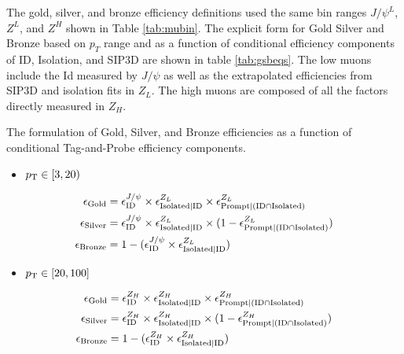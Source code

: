  The gold, silver, and bronze efficiency definitions used the same bin ranges $J/\psi^L$, $Z^L$, and $Z^H$ shown in Table \ref{tab:mubin}. The explicit form for Gold Silver and Bronze based on $p_T$ range and as a function of conditional efficiency components of ID, Isolation, and SIP3D are shown in table \ref{tab:gsbeqs}. The low \pt muons include the Id measured by $J/\psi$ as well as the extrapolated efficiencies from SIP3D and isolation fits in $Z_{L}$. The high \pt muons are composed of all the factors directly measured in $Z_H$.
\begin{table}
\caption{The formulation of Gold, Silver, and Bronze efficiencies as a function of conditional Tag-and-Probe efficiency components.} 
\label{tab:gsbeqs}
\begin{itemize}
\item[] $p_{\mathrm{T}} \in [3,20)$
\end{itemize}
\begin{equation}\label{eq:effcomp_J}
\begin{split}
\epsilon_{\text{Gold}}& = \epsilon_{\text{ID}}^{J/\psi}\times \epsilon_{\text{Isolated}|\text{ID}}^{Z_L} \times \epsilon_{\text{Prompt}|(\text{ID} \cap \text{Isolated})}^{Z_L} \\
\epsilon_{\text{Silver}}& = \epsilon_{\text{ID}}^{J/\psi} \times \epsilon_{\text{Isolated}|\text{ID}}^{Z_L} \times (1-\epsilon_{\text{Prompt}|(\text{ID} \cap \text{Isolated})}^{Z_L}) \\
\epsilon_{\text{Bronze}}& = 1-(\epsilon_{\text{ID}}^{J/\psi} \times \epsilon_{\text{Isolated}|\text{ID}}^{Z_L})
\end{split}
\end{equation}
\begin{itemize}
\item[] $p_{\mathrm{T}} \in [20,100 ]$
\end{itemize}
\begin{equation}\label{eq:effcomp_Z}
\begin{split}
\epsilon_{\text{Gold}}& = \epsilon_{\text{ID}}^{Z_H}\times\epsilon_{\text{Isolated}|\text{ID}}^{Z_H}\times\epsilon_{\text{Prompt}|(\text{ID} \cap \text{Isolated})}^{Z_H} \\
\epsilon_{\text{Silver}}& = \epsilon_{\text{ID}}^{Z_H}\times\epsilon_{\text{Isolated}|\text{ID}}^{Z_H}\times(1-\epsilon_{\text{Prompt}|(\text{ID} \cap \text{Isolated})}^{Z_H})\\
\epsilon_{\text{Bronze}}& = 1-(\epsilon_{\text{ID}}^{Z_H} \times \epsilon_{\text{Isolated}|\text{ID}}^{Z_H})
\end{split}
\end{equation}

\end{table}

